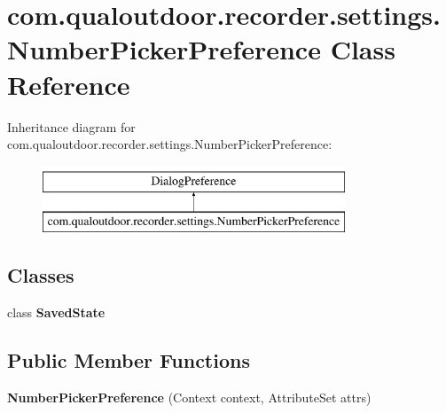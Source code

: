 \hypertarget{classcom_1_1qualoutdoor_1_1recorder_1_1settings_1_1NumberPickerPreference}{\section{com.\-qualoutdoor.\-recorder.\-settings.\-Number\-Picker\-Preference Class Reference}
\label{classcom_1_1qualoutdoor_1_1recorder_1_1settings_1_1NumberPickerPreference}
}
Inheritance diagram for com.\-qualoutdoor.\-recorder.\-settings.\-Number\-Picker\-Preference\-:\begin{figure}[H]
\begin{center}
\leavevmode
\includegraphics[height=2.000000cm]{classcom_1_1qualoutdoor_1_1recorder_1_1settings_1_1NumberPickerPreference}
\end{center}
\end{figure}
\subsection*{Classes}
\begin{DoxyCompactItemize}
\item 
class {\bfseries Saved\-State}
\end{DoxyCompactItemize}
\subsection*{Public Member Functions}
\begin{DoxyCompactItemize}
\item 
\hypertarget{classcom_1_1qualoutdoor_1_1recorder_1_1settings_1_1NumberPickerPreference_ab7fc7c1e58eb2e409a5c456b19200e8e}{{\bfseries Number\-Picker\-Preference} (Context context, Attribute\-Set attrs)}\label{classcom_1_1qualoutdoor_1_1recorder_1_1settings_1_1NumberPickerPreference_ab7fc7c1e58eb2e409a5c456b19200e8e}

\end{DoxyCompactItemize}
